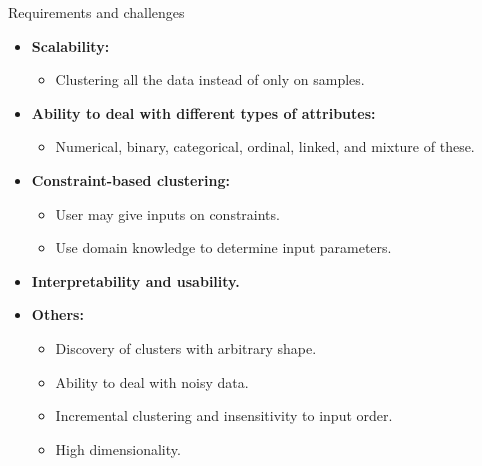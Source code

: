 \documentclass[aspectratio=169,t,xcolor=dvipsnames]{beamer}
\begin{document}
  {
    \begin{frame}{Requirements and challenges}
        \begin{itemize}
          \item \textbf{Scalability:}
          \begin{itemize}
            \item Clustering all the data instead of only on samples.
          \end{itemize}
          \item \textbf{Ability to deal with different types of attributes:}
          \begin{itemize}
            \item Numerical, binary, categorical, ordinal, linked, and mixture of these.
          \end{itemize}
          \item \textbf{Constraint-based clustering:}
          \begin{itemize}
            \item User may give inputs on constraints.
            \item Use domain knowledge to determine input parameters.
          \end{itemize}
          \item \textbf{Interpretability and usability.}
          \item \textbf{Others:}
          \begin{itemize}
            \item Discovery of clusters with arbitrary shape.
            \item Ability to deal with noisy data.
            \item Incremental clustering and insensitivity to input order.
            \item High dimensionality.
          \end{itemize}
        \end{itemize}
    \end{frame}
  }
\end{document}

